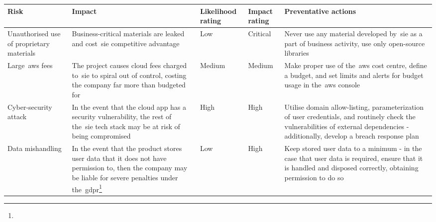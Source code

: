 \begin{tabularx}{\textwidth}{szssz}
    \caption{Business Risks}\label{tab:business-risks}\\
    \hline
    \textbf{Risk} & \textbf{Impact} & \textbf{Likelihood rating} & \textbf{Impact rating} & \textbf{Preventative actions} \\\hline
    Unauthorised use of proprietary materials & Business-critical materials are leaked and cost~\gls{sie} competitive advantage & Low & Critical & Never use any material developed by~\gls{sie} as a part of business activity, use only open-source libraries\\\hline
    Large~\gls{aws} fees & The project causes cloud fees charged to~\gls{sie} to spiral out of control, costing the company far more than budgeted for & Medium & Medium & Make proper use of the~\gls{aws} cost centre, define a budget, and set limits and alerts for budget usage in the~\gls{aws} console \\\hline
    Cyber-security attack & In the event that the cloud app has a security vulnerability, the rest of the~\gls{sie} tech stack may be at risk of being compromised & High & High & Utilise domain allow-listing, parameterization of user credentials, and routinely check the vulnerabilities of external dependencies - additionally, develop a breach response plan \\\hline
    Data mishandling & In the event that the product stores user data that it does not have permission to, then the company may be liable for severe penalties under the~\gls{gdpr}\footnote{} & Low & High & Keep stored user data to a minimum - in the case that user data is required, ensure that it is handled and disposed correctly, obtaining permission to do so

\end{tabularx}

